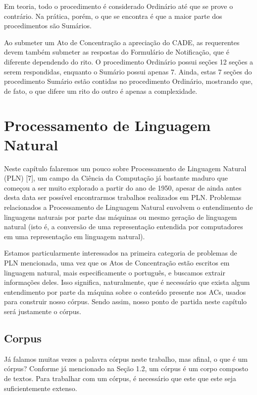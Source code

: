\documentclass[11pt]{report}
\begin{document}
Em teoria, todo o procedimento é considerado Ordinário até que se prove o contrário. Na prática, porém, o que se encontra é que a maior parte dos procedimentos são Sumários.

Ao submeter um Ato de Concentração a apreciação do CADE, as requerentes devem também submeter as respostas do Formulário de Notificação, que é diferente dependendo do rito.
O procedimento Ordinário possui seções 12 seções a serem respondidas, enquanto o Sumário possui apenas 7. Ainda, estas 7 seções do procedimento Sumário estão contidas no
procedimento Ordinário, mostrando que, de fato, o que difere um rito do outro é apenas a complexidade.

\pagebreak
\chapter{Processamento de Linguagem Natural}

\indent\indent Neste capítulo falaremos um pouco sobre Processamento de Linguagem Natural (PLN) [7], um campo da Ciência da Computação já bastante maduro que começou a ser muito
explorado a partir do ano de 1950, apesar de ainda antes desta data ser possível encontrarmos trabalhos realizados em PLN. Problemas relacionados a
Processamento de Linguagem Natural envolvem o entendimento de linguagens naturais por parte das máquinas ou mesmo geração de linguagem natural (isto é, a conversão
de uma representação entendida por computadores em uma representação em linguagem natural).

Estamos particularmente interessados na primeira
categoria de problemas de PLN mencionada, uma vez que os Atos de Concentração estão escritos em linguagem natural, mais especificamente o português, e buscamos extrair informações
deles. Isso significa, naturalmente, que é necessário que exista algum entendimento por parte da máquina sobre o conteúdo presente nos ACs, usados para construir nosso córpus. Sendo
assim, nosso ponto de partida neste capítulo será justamente o córpus.

\section{Corpus}

\indent\indent Já falamos muitas vezes a palavra córpus neste trabalho, mas afinal, o que é um córpus? Conforme já mencionado na Seção 1.2, um córpus é um corpo composto de textos. Para trabalhar com um córpus, é necessário que este que este seja suficientemente extenso.
\end{document}

